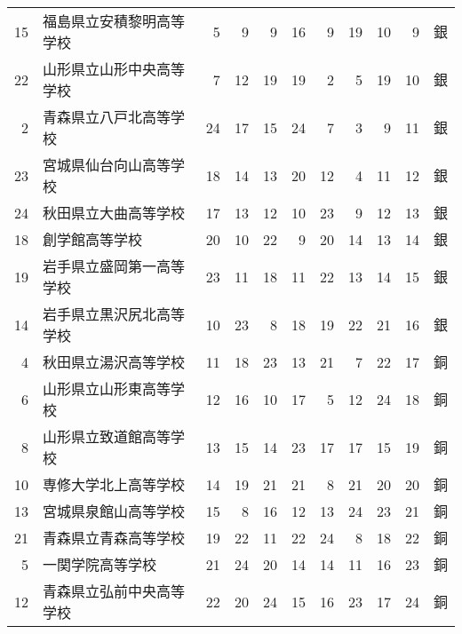 \documentclass[11pt,a4paper,landscape,twoside,openany,english,uplatex]{jsarticle}
\begin{document}
\begin{table}[h]
\begin{tabular}{r|l|rrrrrrr|r|c}
  15 & 福島県立安積黎明高等学校     &  5    &  9    &  9    & 16    &  9    & 19    & 10 &  9 & 銀 \\
  22 & 山形県立山形中央高等学校     &  7    & 12    & 19    & 19    &  2    &  5    & 19 & 10 & 銀 \\
   2 & 青森県立八戸北高等学校       & 24    & 17    & 15    & 24    &  7    &  3    &  9 & 11 & 銀 \\
  23 & 宮城県仙台向山高等学校       & 18    & 14    & 13    & 20    & 12    &  4    & 11 & 12 & 銀 \\
  24 & 秋田県立大曲高等学校         & 17    & 13    & 12    & 10    & 23    &  9    & 12 & 13 & 銀 \\
  18 & 創学館高等学校               & 20    & 10    & 22    &  9    & 20    & 14    & 13 & 14 & 銀 \\
  19 & 岩手県立盛岡第一高等学校     & 23    & 11    & 18    & 11    & 22    & 13    & 14 & 15 & 銀 \\
  14 & 岩手県立黒沢尻北高等学校     & 10    & 23    &  8    & 18    & 19    & 22    & 21 & 16 & 銀 \\
  \hline

   4 & 秋田県立湯沢高等学校         & 11    & 18    & 23    & 13    & 21    &  7    & 22 & 17 & 銅 \\
   6 & 山形県立山形東高等学校       & 12    & 16    & 10    & 17    &  5    & 12    & 24 & 18 & 銅 \\
   8 & 山形県立致道館高等学校       & 13    & 15    & 14    & 23    & 17    & 17    & 15 & 19 & 銅 \\
  10 & 専修大学北上高等学校         & 14    & 19    & 21    & 21    &  8    & 21    & 20 & 20 & 銅 \\
  13 & 宮城県泉館山高等学校         & 15    &  8    & 16    & 12    & 13    & 24    & 23 & 21 & 銅 \\
  21 & 青森県立青森高等学校         & 19    & 22    & 11    & 22    & 24    &  8    & 18 & 22 & 銅 \\
   5 & 一関学院高等学校             & 21    & 24    & 20    & 14    & 14    & 11    & 16 & 23 & 銅 \\
  12 & 青森県立弘前中央高等学校     & 22    & 20    & 24    & 15    & 16    & 23    & 17 & 24 & 銅 \\

  \hline
 \end{tabular}
\end{table}
\end{document}

